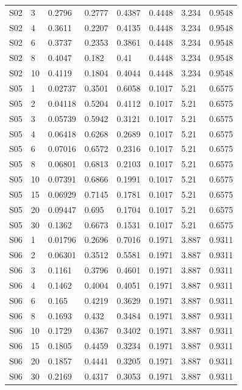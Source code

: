 {\begin{longtable}
{}S02 & 3 & 0.2796 & 0.2777 & 0.4387 & 0.4448 & 3.234 & 0.9548\\
{}S02 & 4 & 0.3611 & 0.2207 & 0.4135 & 0.4448 & 3.234 & 0.9548\\
{}S02 & 6 & 0.3737 & 0.2353 & 0.3861 & 0.4448 & 3.234 & 0.9548\\
{}S02 & 8 & 0.4047 & 0.182 & 0.41 & 0.4448 & 3.234 & 0.9548\\
{}S02 & 10 & 0.4119 & 0.1804 & 0.4044 & 0.4448 & 3.234 & 0.9548\\
{}S05 & 1 & 0.02737 & 0.3501 & 0.6058 & 0.1017 & 5.21 & 0.6575\\
{}S05 & 2 & 0.04118 & 0.5204 & 0.4112 & 0.1017 & 5.21 & 0.6575\\
{}S05 & 3 & 0.05739 & 0.5942 & 0.3121 & 0.1017 & 5.21 & 0.6575\\
{}S05 & 4 & 0.06418 & 0.6268 & 0.2689 & 0.1017 & 5.21 & 0.6575\\
{}S05 & 6 & 0.07016 & 0.6572 & 0.2316 & 0.1017 & 5.21 & 0.6575\\
{}S05 & 8 & 0.06801 & 0.6813 & 0.2103 & 0.1017 & 5.21 & 0.6575\\
{}S05 & 10 & 0.07391 & 0.6866 & 0.1991 & 0.1017 & 5.21 & 0.6575\\
{}S05 & 15 & 0.06929 & 0.7145 & 0.1781 & 0.1017 & 5.21 & 0.6575\\
{}S05 & 20 & 0.09447 & 0.695 & 0.1704 & 0.1017 & 5.21 & 0.6575\\
{}S05 & 30 & 0.1362 & 0.6673 & 0.1531 & 0.1017 & 5.21 & 0.6575\\
{}S06 & 1 & 0.01796 & 0.2696 & 0.7016 & 0.1971 & 3.887 & 0.9311\\
{}S06 & 2 & 0.06301 & 0.3512 & 0.5581 & 0.1971 & 3.887 & 0.9311\\
{}S06 & 3 & 0.1161 & 0.3796 & 0.4601 & 0.1971 & 3.887 & 0.9311\\
{}S06 & 4 & 0.1462 & 0.4004 & 0.4051 & 0.1971 & 3.887 & 0.9311\\
{}S06 & 6 & 0.165 & 0.4219 & 0.3629 & 0.1971 & 3.887 & 0.9311\\
{}S06 & 8 & 0.1693 & 0.432 & 0.3484 & 0.1971 & 3.887 & 0.9311\\
{}S06 & 10 & 0.1729 & 0.4367 & 0.3402 & 0.1971 & 3.887 & 0.9311\\
{}S06 & 15 & 0.1805 & 0.4459 & 0.3234 & 0.1971 & 3.887 & 0.9311\\
{}S06 & 20 & 0.1857 & 0.4441 & 0.3205 & 0.1971 & 3.887 & 0.9311\\
{}S06 & 30 & 0.2169 & 0.4317 & 0.3053 & 0.1971 & 3.887 & 0.9311\\

\end{longtable}}
